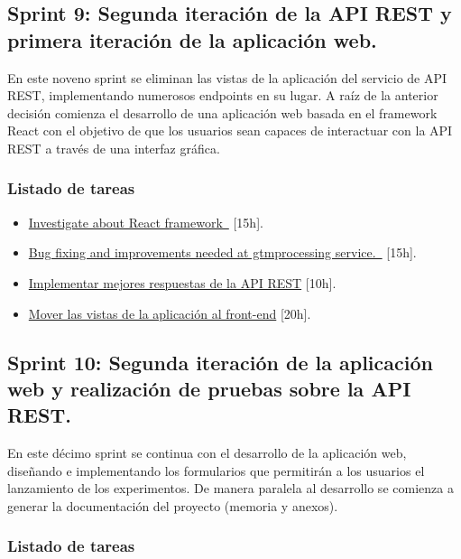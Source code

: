 \subsection{Sprint 9: Segunda iteración de la API REST y primera iteración de la aplicación web.}

En este noveno sprint se eliminan las vistas de la aplicación del servicio de API REST, implementando numerosos endpoints en su lugar. A raíz de la anterior decisión comienza el desarrollo de una aplicación web basada en el framework React con el objetivo de que los usuarios sean capaces de interactuar con la API REST a través de una interfaz gráfica.

\subsubsection{Listado de tareas}

\begin{itemize} \setlength\itemsep{0.2em}
    \item \href{https://github.com/MrpYA45/github-text-mining-tfg/issues/36}{Investigate about React framework } [15h].
    \item \href{https://github.com/MrpYA45/github-text-mining-tfg/issues/35}{Bug fixing and improvements needed at gtmprocessing service. } [15h].
    \item \href{https://github.com/MrpYA45/github-text-mining-tfg/issues/20}{Implementar mejores respuestas de la API REST} [10h].
    \item \href{https://github.com/MrpYA45/github-text-mining-tfg/issues/19}{Mover las vistas de la aplicación al front-end} [20h].
\end{itemize}

\subsection{Sprint 10: Segunda iteración de la aplicación web y realización de pruebas sobre la API REST.}

En este décimo sprint se continua con el desarrollo de la aplicación web, diseñando e implementando los formularios que permitirán a los usuarios el lanzamiento de los experimentos. De manera paralela al desarrollo se comienza a generar la documentación del proyecto (memoria y anexos).

\subsubsection{Listado de tareas}

